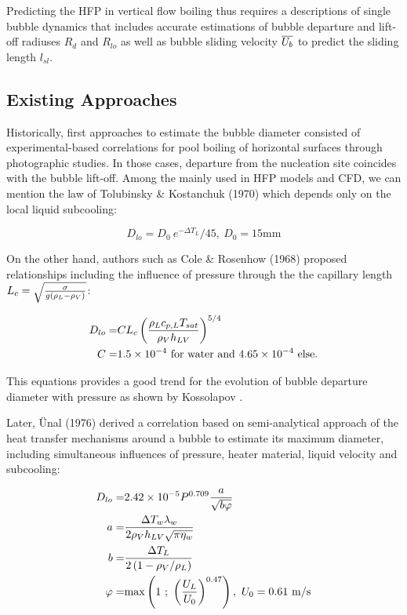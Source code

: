 \npar 

Predicting the HFP in vertical flow boiling thus requires a descriptions of single bubble dynamics that includes accurate estimations of bubble departure and lift-off radiuses $R_{d}$ and $R_{lo}$ as well as bubble sliding velocity $\overline{U_{b}}$ to predict the sliding length $l_{sl}$.

\subsection{Existing Approaches}

Historically, first approaches to estimate the bubble diameter consisted of experimental-based correlations for pool boiling of horizontal surfaces through photographic studies. In those cases, departure from the nucleation site coincides with the bubble lift-off. Among the mainly used in HFP models and CFD, we can mention the law of Tolubinsky \& Kostanchuk (1970)\cite{tolubinsky_diam} which depends only on the local liquid subcooling:

\begin{equation}
D_{lo} = D_{0}~e^{-\Delta T_{L}}/{45},\ D_{0}=15\mathrm{mm}
\end{equation}

\npar
On the other hand, authors such as Cole \& Rosenhow (1968) proposed relationships including the influence of pressure through the the capillary length $L_{c}=\sqrt{\frac{\sigma}{g\left( \rho_{L}-\rho_{V} \right)}}$:

\begin{align}
D_{lo} =& C L_{c} \left( \frac{\rho_{L}c_{p,L}T_{sat}}{\rho_{V}h_{LV}} \right)^{5/4}\\
\nonumber C=&1.5\times 10^{-4}\ \text{for water and }4.65\times 10^{-4}\ \text{else}.
\end{align}

This equations provides a good trend for the evolution of bubble departure diameter with pressure as shown by Kossolapov \cite{kossolapov_experimental_2021}.

\npar

Later, \"Unal (1976)\cite{unal_maximum_1976} derived a correlation based on semi-analytical approach of the heat transfer mechanisms around a bubble to estimate its maximum diameter, including simultaneous influences of pressure, heater material, liquid velocity and subcooling:

\begin{align}
D_{lo}=& 2.42\times 10^{-5} P^{0.709}\frac{a}{\sqrt{b\varphi}}\\
\nonumber a =& \frac{\Delta T_{w}\lambda_{w}}{2\rho_{V}h_{LV}\sqrt{\pi \eta_{w}} }\\
\nonumber b =& \frac{\Delta T_{L}}{2\parth{1-\rho_{V}/\rho_{L}}}\\
\nonumber \varphi=& \max{1\ ;\ \parth{\frac{U_{L}}{U_{0}}}^{0.47}},\ U_{0}=0.61~\mathrm{m/s}
\end{align}

